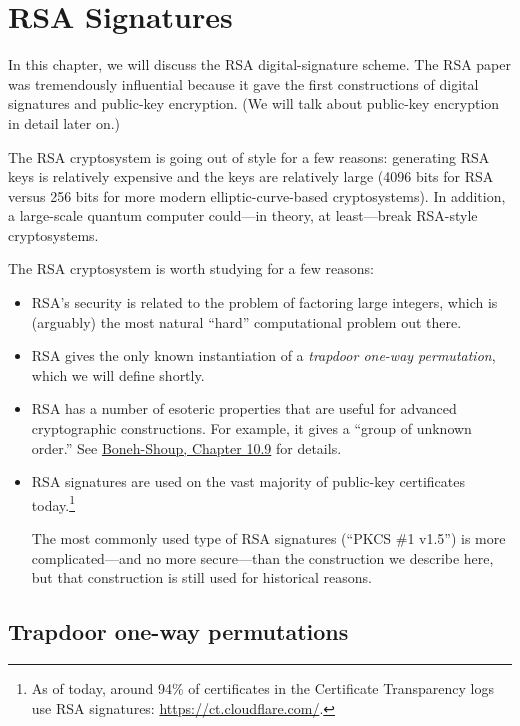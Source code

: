 
\chapter{RSA Signatures}
\label{chap:rsa}

In this chapter, we will discuss the RSA digital-signature scheme.
The RSA paper\autocite{RSA} was tremendously influential because it gave
the first constructions of digital signatures and public-key encryption.
(We will talk about public-key encryption in detail later on.)

The RSA cryptosystem is going out of style for a few reasons: 
generating RSA keys is relatively expensive and the keys are relatively large
(4096 bits for RSA versus 256 bits for more modern elliptic-curve-based cryptosystems).
In addition, a large-scale quantum computer could---in theory, at least---break
RSA-style cryptosystems.

The RSA cryptosystem is worth studying for a few reasons:
\begin{itemize}
  \item RSA's security is related to the problem of factoring large integers,
        which is (arguably) the most natural ``hard'' computational problem
        out there.
       
  \item RSA gives the only known instantiation of a \emph{trapdoor one-way permutation},
        which we will define shortly.

  \item RSA has a number of esoteric properties that are useful for advanced
        cryptographic constructions. For example, it gives a ``group of unknown order.''
        See
    \href{https://toc.cryptobook.us/book.pdf#page=436}{Boneh-Shoup, Chapter 10.9} for details.

  \item RSA signatures are used on the vast majority of public-key certificates today.\footnote{As
    of today, around 94\% of certificates in the Certificate Transparency logs use RSA signatures:
\url{https://ct.cloudflare.com/}.}

The most commonly used type of RSA signatures (``PKCS \#1 v1.5'') is
more complicated---and no more secure---than the
construction we describe here, but that
construction is still used for historical reasons.

\end{itemize}

\section{Trapdoor one-way permutations}

